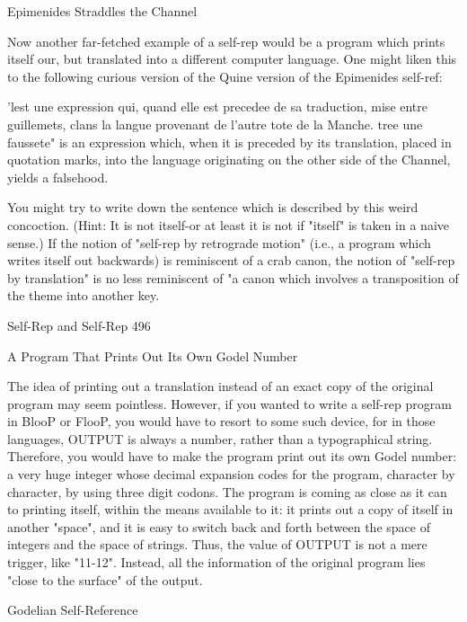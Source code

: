 {                               Epimenides Straddles the Channel

Now another far-fetched example of a self-rep would be a program which prints itself our,
but translated into a different computer language. One might liken this to the following
curious version of the Quine version of the Epimenides self-ref:

     'lest une expression qui, quand elle est precedee de sa traduction, mise entre
     guillemets, clans la langue provenant de l'autre tote de la Manche. tree une faussete"
     is an expression which, when it is preceded by its translation, placed in quotation
     marks, into the language originating on the other side of the Channel, yields a
     falsehood.

You might try to write down the sentence which is described by this weird concoction. (Hint:
It is not itself-or at least it is not if "itself" is taken in a naive sense.) If the notion of "self-rep
by retrograde motion" (i.e., a program which writes itself out backwards) is reminiscent of a
crab canon, the notion of "self-rep by translation" is no less reminiscent of "a canon which
involves a transposition of the theme into another key.




Self-Rep and Self-Rep                                                                               496

                    A Program That Prints Out Its Own Godel Number

The idea of printing out a translation instead of an exact copy of the original program may
seem pointless. However, if you wanted to write a self-rep program in BlooP or FlooP, you
would have to resort to some such device, for in those languages, OUTPUT is always a
number, rather than a typographical string. Therefore, you would have to make the program
print out its own Godel number: a very huge integer whose decimal expansion codes for the
program, character by character, by using three digit codons. The program is coming as close
as it can to printing itself, within the means available to it: it prints out a copy of itself in
another "space", and it is easy to switch back and forth between the space of integers and the
space of strings. Thus, the value of OUTPUT is not a mere trigger, like "11-12". Instead, all
the information of the original program lies "close to the surface" of the output.

                                   Godelian Self-Reference

}
